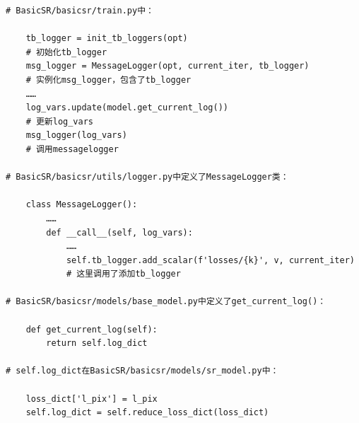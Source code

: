 \documentclass[../main.tex]{subfiles}
\begin{document}
\begin{verbatim}
# BasicSR/basicsr/train.py中：

    tb_logger = init_tb_loggers(opt)
    # 初始化tb_logger
    msg_logger = MessageLogger(opt, current_iter, tb_logger)
    # 实例化msg_logger，包含了tb_logger
    ……
    log_vars.update(model.get_current_log())
    # 更新log_vars
    msg_logger(log_vars)
    # 调用messagelogger

# BasicSR/basicsr/utils/logger.py中定义了MessageLogger类：

    class MessageLogger():
        ……
        def __call__(self, log_vars):
            ……
            self.tb_logger.add_scalar(f'losses/{k}', v, current_iter)
            # 这里调用了添加tb_logger
            
# BasicSR/basicsr/models/base_model.py中定义了get_current_log()：

    def get_current_log(self):
        return self.log_dict

# self.log_dict在BasicSR/basicsr/models/sr_model.py中：

    loss_dict['l_pix'] = l_pix
    self.log_dict = self.reduce_loss_dict(loss_dict)
\end{verbatim}
\end{document}

